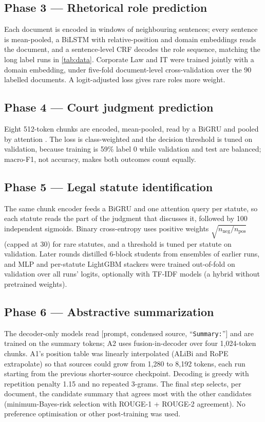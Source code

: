 \documentclass[11pt, oneside]{article}
\begin{document}
\subsection{Phase 3 --- Rhetorical role prediction}
Each document is encoded in windows of neighbouring sentences; every sentence is mean-pooled, a BiLSTM with
relative-position and domain embeddings reads the document, and a sentence-level CRF \cite{lafferty2001crf}
decodes the role sequence, matching the long label runs in \autoref{tab:data}.  Corporate Law and IT were
trained jointly with a domain embedding, under five-fold document-level cross-validation over the 90 labelled
documents.  A logit-adjusted loss gives rare roles more weight.

\subsection{Phase 4 --- Court judgment prediction}
Eight 512-token chunks are encoded, mean-pooled, read by a BiGRU and pooled by attention \cite{yang2016han}.
The loss is class-weighted and the decision threshold is tuned on validation, because training is 59\% label 0
while validation and test are balanced; macro-F1, not accuracy, makes both outcomes count equally.

\subsection{Phase 5 --- Legal statute identification}
The same chunk encoder feeds a BiGRU and one attention query per statute, so each statute reads the part of the
judgment that discusses it, followed by 100 independent sigmoids.  Binary cross-entropy uses positive weights
$\sqrt{n_\text{neg}/n_\text{pos}}$ (capped at 30) for rare statutes, and a threshold is tuned per statute on
validation.  Later rounds distilled 6-block students from ensembles of earlier runs, and MLP and per-statute
LightGBM \cite{ke2017lightgbm} stackers were trained out-of-fold on validation over all runs' logits,
optionally with TF-IDF models (a hybrid without pretrained weights).

\subsection{Phase 6 --- Abstractive summarization}
The decoder-only models read [prompt, condensed source, ``\texttt{Summary:}''] and are trained on the summary
tokens; A2 uses fusion-in-decoder \cite{izacard2021fid} over four 1,024-token chunks.  A1's position table was
linearly interpolated \cite{chen2023pi} (ALiBi and RoPE extrapolate) so that sources could grow from 1,280 to
8,192 tokens, each run starting from the previous shorter-source checkpoint.  Decoding is greedy with repetition penalty 1.15 and no repeated 3-grams.
The final step selects, per document, the candidate summary that agrees most with the other candidates
(minimum-Bayes-risk selection \cite{kumar2004mbr} with ROUGE-1 + ROUGE-2 agreement).  No preference
optimisation or other post-training was used.
\end{document}
